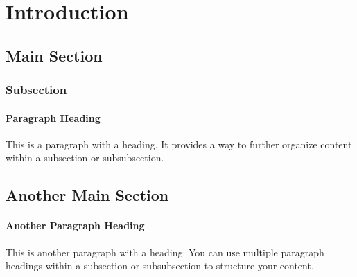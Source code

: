 \section{Introduction}


\lipsum[1] %

\subsection{Main Section}
\lipsum[2] %

\subsubsection{Subsection}
\lipsum[3] %

\paragraph{Paragraph Heading}
This is a paragraph with a heading. It provides a way to further organize content within a subsection or subsubsection.

\lipsum[4] %

\subsection{Another Main Section}
\lipsum[5] %

\paragraph{Another Paragraph Heading}
This is another paragraph with a heading. You can use multiple paragraph headings within a subsection or subsubsection to structure your content.

\lipsum[6] %

\lipsum[7] %

\lipsum[8] %

\lipsum[9] %